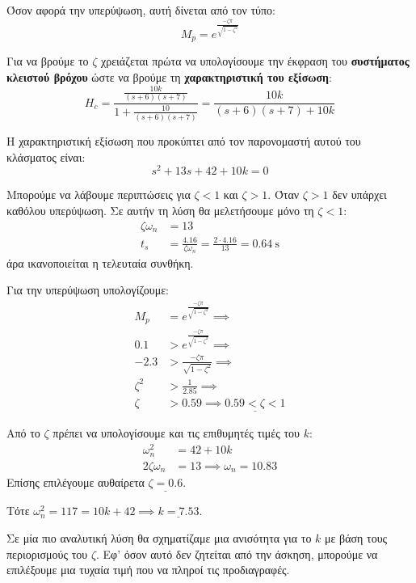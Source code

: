 \documentclass[11pt,a4paper,notitlepage,fleqn]{article}
\begin{document}
\begin{exercise}
\subparagraph{}
Όσον αφορά την υπερύψωση, αυτή δίνεται από τον τύπο:
\[
M_p = e^{\frac{-ζπ}{\sqrt{1-ζ^2}}}
\]

Για να βρούμε το \( ζ \) χρειάζεται πρώτα να υπολογίσουμε την έκφραση του \textbf{συστήματος
	κλειστού βρόχου} ώστε να βρούμε τη \textbf{χαρακτηριστική του εξίσωση}:
\[
H_c = \frac{\frac{10k}{(s+6)(s+7)}}{1+\frac{10}{(s+6)(s+7)}}
= \frac{10k}{(s+6)(s+7)+10k}
\]

Η χαρακτηριστική εξίσωση που προκύπτει από τον παρονομαστή αυτού του κλάσματος είναι:
\[
s^2+13s+42+10k = 0
\]

Μπορούμε να λάβουμε περιπτώσεις για \( ζ<1 \) και \( ζ>1 \). Όταν \( ζ>1 \) δεν υπάρχει
καθόλου υπερύψωση. Σε αυτήν τη λύση θα μελετήσουμε μόνο τη \( ζ<1 \):
	\begin{align*}
	ζ\omega_ n &= 13 \\
	t_s &= \frac{4.16}{ζ\omega_n} = \frac{2\cdot 4.16}{13}
	= \SI{0.64}{\second}
	\end{align*}
άρα ικανοποιείται η τελευταία συνθήκη.

Για την υπερύψωση υπολογίζουμε:
\begin{align*}
	M_p &= e^{\frac{-ζπ}{\sqrt{1-ζ^2}}}
	\implies \\
	0.1 &> e^{\frac{-ζπ}{\sqrt{1-ζ^2}}}
	\implies \\
	-2.3 &> \frac{-ζπ}{\sqrt{1-ζ^2}}
	\implies \\
	ζ^2 &> \frac{1}{2.85} \implies \\
	ζ &> 0.59 \implies \underline{0.59 < ζ < 1}
\end{align*}

Από το \( ζ \) πρέπει να υπολογίσουμε και τις επιθυμητές τιμές του \( k \):
\begin{align*}
	\omega_n^2 &= 42+10k \\
	2ζ\omega_n &= 13 \implies \omega_n = 10.83
\end{align*}
Επίσης επιλέγουμε αυθαίρετα \( \underline{ζ=0.6} \).

Τότε \( \omega_n^2 = 117 = 10k+42 \implies \underline{k=7.53} \).

Σε μία πιο αναλυτική λύση θα σχηματίζαμε μια ανισότητα για το \( k \) με βάση τους περιορισμούς του \( ζ \). Εφ' όσον αυτό δεν ζητείται από την άσκηση, μπορούμε να επιλέξουμε
μια τυχαία τιμή που να πληροί τις προδιαγραφές.

\end{exercise}
\end{document}
